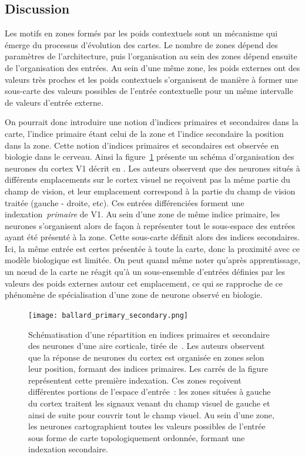 \documentclass[../main]{subfiles}
\begin{document}
\subsection{Discussion}

Les motifs en zones formés par les poids contextuels sont un mécanisme qui émerge du processus d'évolution des cartes.
Le nombre de zones dépend des paramètres de l'architecture, puis l'organisation au sein des zones dépend ensuite de l'organisation des entrées. 
Au sein d'une même zone, les poids externes ont des valeurs très proches et les poids contextuels s'organisent de manière à former une sous-carte des valeurs possibles de l'entrée contextuelle pour un même intervalle de valeurs d'entrée externe.


On pourrait donc introduire une notion d'indices primaires et secondaires dans la carte, l'indice primaire étant celui de la zone et l'indice secondaire la position dans la zone.
Cette notion d'indices primaires et secondaires est observée en biologie dans le cerveau. 
Ainsi la figure~\ref{fig:ballard} présente un schéma d'organisation des neurones du cortex V1 décrit en \cite{ballard_cortical_1986}.
Les auteurs observent que des neurones situés à différents emplacements sur le cortex visuel ne reçoivent pas la même partie du champ de vision, et leur emplacement correspond à la partie du champ de vision traitée (gauche - droite, etc).
Ces entrées différenciées forment une indexation~\emph{primaire} de V1. 
Au sein d'une zone de même indice primaire, les neurones s'organisent alors de façon à représenter tout le sous-espace des entrées ayant été présenté à la zone. Cette sous-carte définit alors des indices secondaires.
Ici, la même entrée est certes présentée à toute la carte, donc la proximité avec ce modèle biologique est limitée. On peut quand même noter qu'après apprentissage, un n\oe{}ud de la carte ne réagit qu'à un sous-ensemble d'entrées définies par les valeurs des poids externes autour cet emplacement, ce qui se rapproche de ce phénomène de spécialisation d'une zone de neurone observé en biologie.


\begin{figure}[H]
	\centering\texttt{[image: ballard\_primary\_secondary.png]}
	\caption{Schématisation d'une répartition en indices primaires et secondaire des neurones d'une aire corticale, tirée de~\cite{ballard_cortical_1986}. 
	Les auteurs observent que la réponse de neurones du cortex est organisée en zones selon leur position, formant des indices primaires. Les carrés de la figure représentent cette première indexation.
	Ces zones reçoivent différentes portions de l'espace d'entrée~: les zones situées à gauche du cortex traitent les signaux venant du champ visuel de gauche et ainsi de suite pour couvrir tout le champ visuel.
	Au sein d'une zone, les neurones cartographient toutes les valeurs possibles de l'entrée sous forme de carte topologiquement ordonnée, formant une indexation secondaire. \label{fig:ballard}}
\end{figure}
\end{document}
